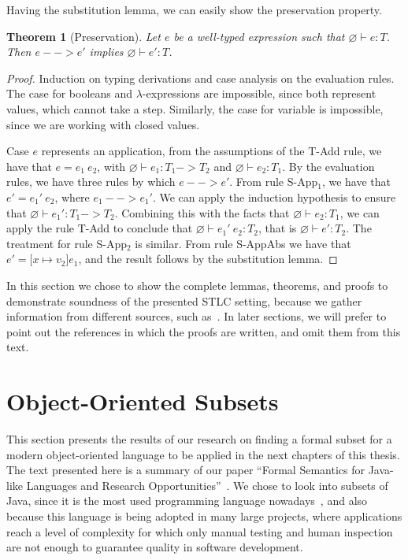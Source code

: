 \documentclass[tese,capa,english]{texufpel}
\newtheorem{theorem}{Theorem}
\begin{document}
Having the substitution lemma, we can easily show the preservation property.

\begin{theorem}[Preservation]
Let $e$ be a well-typed expression such that $\varnothing \vdash e : T$. Then $e --> e'$ implies $\varnothing \vdash e' : T$.
\end{theorem}

\begin{proof}
  Induction on typing derivations and case analysis on the evaluation rules. The case for booleans and $\lambda$-expressions are impossible, since both represent values, which cannot take a step. Similarly, the case for variable is impossible, since we are working with closed values. \vspace{3pt}

  Case $e$ represents an application, from the assumptions of the {\footnotesize T-Add} rule, we have that $e = e_1 ~ e_2$, with $\varnothing \vdash e_1 : T_1 -> T_2$ and $\varnothing \vdash e_2 : T_1$. By the evaluation rules, we have three rules by which $e --> e'$. From rule {\footnotesize S-App$_1$}, we have that $e' = e_1' ~ e_2$, where $e_1 --> e_1'$. We can apply the induction hypothesis to ensure that $\varnothing \vdash e_1' : T_1 -> T_2$. Combining this with the facts that $\varnothing \vdash e_2 : T_1$, we can apply the rule {\footnotesize T-Add} to conclude that $\varnothing \vdash e_1' ~ e_2 : T_2$, that is $\varnothing \vdash e' : T_2$. The treatment for rule {\footnotesize S-App$_2$} is similar. From rule {\footnotesize S-AppAbs} we have that $e' = \lbrack x \mapsto v_2 \rbrack e_1$, and the result follows by the substitution lemma.
\end{proof}

In this section we chose to show the complete lemmas, theorems, and proofs to demonstrate soundness of the presented STLC setting, because we gather information from different sources, such as~\cite{Pierce:2002:TPL:509043,Wadler-plfa,pierce2019software}. In later sections, we will prefer to point out the references in which the proofs are written, and omit them from this text. 

\section{Object-Oriented Subsets}

This section presents the results of our research on finding a formal subset for a modern object-oriented language to be applied in the next chapters of this thesis. The text presented here is a summary of our paper ``Formal Semantics for Java-like Languages and Research Opportunities''~\cite{feitosa2018-1}. We chose to look into subsets of Java, since it is the most used programming language nowadays~\cite{tiobe2019}, and also because this language is being adopted in many large projects, where applications reach a level of complexity for which only manual testing and human inspection are not enough to guarantee quality in software development.
\end{document}
